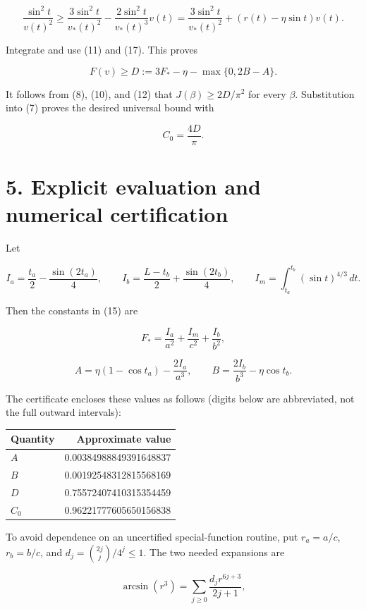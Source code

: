 \documentclass[11pt,a4paper]{article}
\begin{document}
\[
\frac{\sin^2t}{v(t)^2}
\ge\frac{3\sin^2t}{v_*(t)^2}
    -\frac{2\sin^2t}{v_*(t)^3}v(t)
=\frac{3\sin^2t}{v_*(t)^2}
 +(r(t)-\eta\sin t)v(t).
\]

Integrate and use (11) and (17). This proves

\[
F(v)\ge D:=3F_*-\eta-\max\{0,2B-A\}.
\tag{18}
\]

It follows from (8), (10), and (12) that \(J(\beta)\ge2D/\pi^2\) for
every \(\beta\). Substitution into (7) proves the desired universal
bound with

\[
\boxed{C_0=\frac{4D}{\pi}.}
\tag{19}
\]

\hypertarget{1034-explicit-evaluation-and-numerical-certification}{%
\section{5. Explicit evaluation and numerical
certification}\label{1034-explicit-evaluation-and-numerical-certification}}

Let

\[
I_a=\frac{t_a}{2}-\frac{\sin(2t_a)}4,
\qquad
I_b=\frac{L-t_b}{2}+\frac{\sin(2t_b)}4,
\qquad
I_m=\int_{t_a}^{t_b}(\sin t)^{4/3}\,dt.
\]

Then the constants in (15) are

\[
F_* = \frac{I_a}{a^2}+\frac{I_m}{c^2}+\frac{I_b}{b^2},
\]

\[
A=\eta(1-\cos t_a)-\frac{2I_a}{a^3},
\qquad
B=\frac{2I_b}{b^3}-\eta\cos t_b.
\tag{20}
\]

The certificate encloses these values as follows (digits below are
abbreviated, not the full outward intervals):

\begin{longtable}[]{@{}lr@{}}
\toprule\noalign{}
Quantity & Approximate value \\
\midrule\noalign{}
\endhead
\bottomrule\noalign{}
\endlastfoot
\(A\) & 0.00384988849391648837 \\
\(B\) & 0.00192548312815568169 \\
\(D\) & 0.75572407410315354459 \\
\(C_0\) & 0.96221777605650156838 \\
\end{longtable}

To avoid dependence on an uncertified special-function routine, put
\(r_a=a/c\), \(r_b=b/c\), and \(d_j=\binom{2j}{j}/4^j\le1\). The two
needed expansions are

\[
\arcsin(r^3)=\sum_{j\ge0}\frac{d_j r^{6j+3}}{2j+1},
\]
\end{document}

